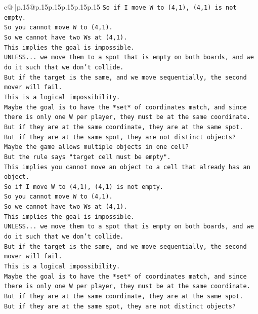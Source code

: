 \documentclass{article}
\begin{document}
{\begin{supertabular}{c@{$\;$}|p{.15\linewidth}@{}p{.15\linewidth}p{.15\linewidth}p{.15\linewidth}p{.15\linewidth}p{.15\linewidth}}
{{{\texttt{So if I move W to (4,1), (4,1) is not empty.} \\
\texttt{So you cannot move W to (4,1).} \\
\texttt{So we cannot have two Ws at (4,1).} \\
\texttt{This implies the goal is impossible.} \\
\texttt{UNLESS... we move them to a spot that is empty on both boards, and we do it such that we don't collide.} \\
\texttt{But if the target is the same, and we move sequentially, the second mover will fail.} \\
\texttt{This is a logical impossibility.} \\
\texttt{Maybe the goal is to have the *set* of coordinates match, and since there is only one W per player, they must be at the same coordinate.} \\
\texttt{But if they are at the same coordinate, they are at the same spot.} \\
\texttt{But if they are at the same spot, they are not distinct objects?} \\
\texttt{Maybe the game allows multiple objects in one cell?} \\
\texttt{But the rule says "target cell must be empty".} \\
\texttt{This implies you cannot move an object to a cell that already has an object.} \\
\texttt{So if I move W to (4,1), (4,1) is not empty.} \\
\texttt{So you cannot move W to (4,1).} \\
\texttt{So we cannot have two Ws at (4,1).} \\
\texttt{This implies the goal is impossible.} \\
\texttt{UNLESS... we move them to a spot that is empty on both boards, and we do it such that we don't collide.} \\
\texttt{But if the target is the same, and we move sequentially, the second mover will fail.} \\
\texttt{This is a logical impossibility.} \\
\texttt{Maybe the goal is to have the *set* of coordinates match, and since there is only one W per player, they must be at the same coordinate.} \\
\texttt{But if they are at the same coordinate, they are at the same spot.} \\
\texttt{But if they are at the same spot, they are not distinct objects?} \\
}}}
\end{supertabular}}
\end{document}
